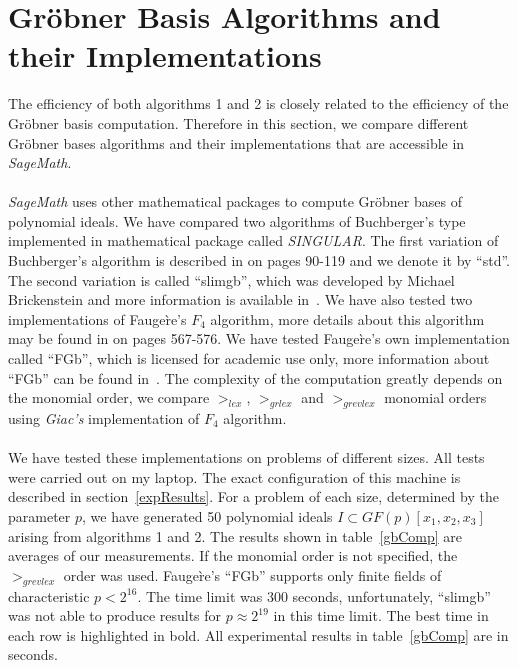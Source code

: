\documentclass[thesis=M,english]{FITthesis}[2012/10/20]
\theoremstyle{remark}
\theoremstyle{definition}
\begin{document}
\section{Gröbner Basis Algorithms and their Implementations}
The efficiency of both algorithms 1 and 2 is closely related to the efficiency of the Gröbner basis computation. Therefore in this section, we compare different Gröbner bases algorithms and their implementations that are accessible in \textit{SageMath}. \\\\
\noindent \textit{SageMath} uses other mathematical packages to compute Gröbner bases of polynomial ideals. We have compared two algorithms of Buchberger's type implemented in mathematical package called \textit{SINGULAR}. The first variation of Buchberger's algorithm is described in \cite{algGeom} on pages 90-119 and we denote it by \enquote{std}. The second variation is called \enquote{slimgb}, which was developed by Michael Brickenstein and more information is available in~\cite{brick}. We have also tested two implementations of Fauge\`re's $F_4$ algorithm, more details about this algorithm may be found in \cite{algGeom} on pages 567-576. We have tested Fauge\`re's own implementation called \enquote{FGb}, which is licensed for academic use only, more information about \enquote{FGb} can be found in~\cite{fgb}. The complexity of the computation greatly depends on the monomial order, we compare $>_{lex}$, $>_{grlex}$ and $>_{grevlex}$ monomial orders using \textit{Giac's} implementation of $F_4$ algorithm.
\\ \\
\noindent We have tested these implementations on problems of different sizes. All tests were carried out on my laptop. The exact configuration of this machine is described in section~\ref{expResults}. For a problem of each size, determined by the parameter $p$, we have generated 50 polynomial ideals $I \subset GF(p)[x_1,x_2,x_3]$ arising from algorithms 1 and 2. The results shown in table~\ref{gbComp} are averages of our measurements. If the monomial order is not specified, the $>_{grevlex}$ order was used. Fauge\`re's \enquote{FGb} supports only finite fields of characteristic $p < 2^{16}$. The time limit was 300 seconds, unfortunately, \enquote{slimgb} was not able to produce results for $p \approx 2^{19}$ in this time limit. The best time in each row is highlighted in bold. All experimental results in table~\ref{gbComp} are in seconds. 
\\ \\
\end{document}

